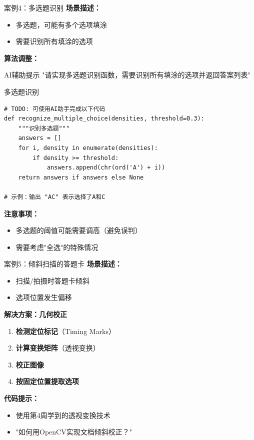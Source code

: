 \begin{frame}{案例4：多选题识别}
    \textbf{场景描述：}
    \begin{itemize}
        \item 多选题，可能有多个选项填涂
        \item 需要识别所有填涂的选项
    \end{itemize}

    \vspace{0.3cm}

    \textbf{算法调整：}
    \begin{block}{AI辅助提示}
        \aihint{} "请实现多选题识别函数，需要识别所有填涂的选项并返回答案列表"
    \end{block}

    \begin{block}{多选题识别}
    \begin{lstlisting}
# TODO: 可使用AI助手完成以下代码
def recognize_multiple_choice(densities, threshold=0.3):
    """识别多选题"""
    answers = []
    for i, density in enumerate(densities):
        if density >= threshold:
            answers.append(chr(ord('A') + i))
    return answers if answers else None

# 示例：输出 "AC" 表示选择了A和C
    \end{lstlisting}
    \end{block}

    \textbf{注意事项：}
    \begin{itemize}
        \item 多选题的阈值可能需要调高（避免误判）
        \item 需要考虑"全选"的特殊情况
    \end{itemize}
\end{frame}

\begin{frame}{案例5：倾斜扫描的答题卡}
    \textbf{场景描述：}
    \begin{itemize}
        \item 扫描/拍摄时答题卡倾斜
        \item 选项位置发生偏移
    \end{itemize}

    \vspace{0.3cm}

    \textbf{解决方案：几何校正}
    \begin{enumerate}
        \item \textbf{检测定位标记}（Timing Marks）
        \item \textbf{计算变换矩阵}（透视变换）
        \item \textbf{校正图像}
        \item \textbf{按固定位置提取选项}
    \end{enumerate}

    \textbf{代码提示：}
    \begin{itemize}
        \item 使用第4周学到的透视变换技术
        \item \aihint{} "如何用OpenCV实现文档倾斜校正？"
    \end{itemize}
\end{frame}

